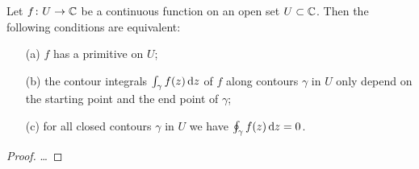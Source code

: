 \begin{theorem}
  \label{thm:primitive_characterization}
  Let $f \colon U \to \mathbb{C}$ be a continuous function on an open
  set $U \subset \mathbb{C}$. Then the following conditions are equivalent:
  \begin{itemize}
    \item[(a)] $f$ has a primitive on $U$;
    \item[(b)] the contour integrals $\int_\gamma f(z) \, \mathrm{d} z$
      of $f$ along contours $\gamma$ in $U$ only depend on the
      starting point and the end point of $\gamma$;
    \item[(c)] for all closed contours $\gamma$ in $U$ we have
      $\oint_\gamma f(z) \, \mathrm{d} z = 0$.
  \end{itemize}
\end{theorem}
\begin{proof}
  \ldots
\end{proof}
